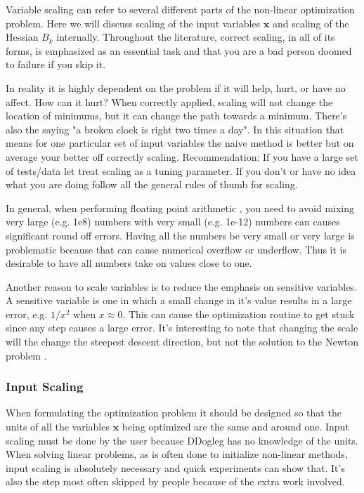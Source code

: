 \documentclass[peerreview,compsoc,onecolumn]{IEEEtran}
\begin{document}
Variable scaling can refer to several different parts of the non-linear optimization problem. Here we will discuss scaling of the input variables $\bm{x}$ and scaling of the Hessian $B_k$ internally. Throughout the literature, correct scaling, in all of its forms, is emphasized as an essential task and that you are a bad person doomed to failure if you skip it. 

In reality it is highly dependent on the problem if it will help, hurt, or have no affect. How can it hurt? When correctly applied, scaling will not change the location of minimums, but it can change the path towards a minimum. There's also the saying "a broken clock is right two times a day". In this situation that means for one particular set of input variables the naive method is better but on average your better off correctly scaling. Recommendation: If you have a large set of tests/data let treat scaling as a tuning parameter. If you don't or have no idea what you are doing follow all the general rules of thumb for scaling.

In general, when performing floating point arithmetic \cite{goldberg1991every}, you need to avoid mixing very large (e.g. 1e8) numbers with very small (e.g. 1e-12) numbers can causes significant round off errors. Having all the numbers be very small or very large is problematic because that can cause numerical overflow or underflow. Thus it is desirable to have all numbers take on values close to one.

Another reason to scale variables is to reduce the emphasis on sensitive variables. A sensitive variable is one in which a small change in it's value results in a large error, e.g. $1/x^2$ when $x \approx 0$. This can cause the optimization routine to get stuck since any step causes a large error. It's interesting to note that changing the scale will the change the steepest descent direction, but not the solution to the Newton problem \cite{dennis1996}.

\subsubsection{Input Scaling}

When formulating the optimization problem it should be designed so that the units
of all the variables $\bm{x}$ being optimized are the same and around one. Input scaling must be done by the user because DDogleg has no knowledge of the units. When solving linear problems, as is often done to initialize non-linear methods, input scaling is absolutely necessary and quick experiments can show that. It's also the step most often skipped by people because of the extra work involved.
\end{document}
